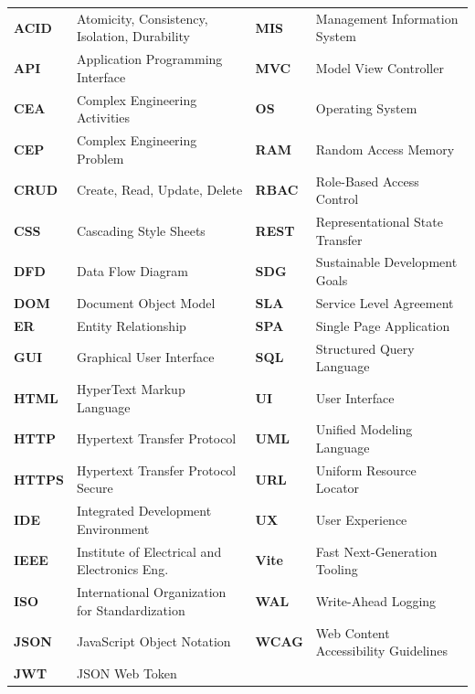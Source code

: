\documentclass[10pt]{report}
\begin{document}
\vspace{0.2cm}
\begin{center}
\small
\renewcommand{\arraystretch}{1.18}
\begin{tabular}{@{}lp{6.2cm}@{\hspace{0.8cm}}lp{6.2cm}@{}}
\textbf{ACID} & Atomicity, Consistency, Isolation, Durability & \textbf{MIS}   & Management Information System \\
\textbf{API}  & Application Programming Interface             & \textbf{MVC}   & Model View Controller \\
\textbf{CEA}  & Complex Engineering Activities                & \textbf{OS}    & Operating System \\
\textbf{CEP}  & Complex Engineering Problem                   & \textbf{RAM}   & Random Access Memory \\
\textbf{CRUD} & Create, Read, Update, Delete                  & \textbf{RBAC}  & Role-Based Access Control \\
\textbf{CSS}  & Cascading Style Sheets                        & \textbf{REST}  & Representational State Transfer \\
\textbf{DFD}  & Data Flow Diagram                             & \textbf{SDG}   & Sustainable Development Goals \\
\textbf{DOM}  & Document Object Model                         & \textbf{SLA}   & Service Level Agreement \\
\textbf{ER}   & Entity Relationship                           & \textbf{SPA}   & Single Page Application \\
\textbf{GUI}  & Graphical User Interface                      & \textbf{SQL}   & Structured Query Language \\
\textbf{HTML} & HyperText Markup Language                     & \textbf{UI}    & User Interface \\
\textbf{HTTP} & Hypertext Transfer Protocol                   & \textbf{UML}   & Unified Modeling Language \\
\textbf{HTTPS}& Hypertext Transfer Protocol Secure            & \textbf{URL}   & Uniform Resource Locator \\
\textbf{IDE}  & Integrated Development Environment           & \textbf{UX}    & User Experience \\
\textbf{IEEE} & Institute of Electrical and Electronics Eng.  & \textbf{Vite}  & Fast Next-Generation Tooling \\
\textbf{ISO}  & International Organization for Standardization& \textbf{WAL}   & Write-Ahead Logging \\
\textbf{JSON} & JavaScript Object Notation                    & \textbf{WCAG}  & Web Content Accessibility Guidelines \\
\textbf{JWT}  & JSON Web Token                                & & 
\end{tabular}
\end{center}
\end{document}
